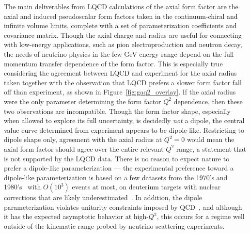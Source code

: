 

The main deliverables from LQCD calculations of the axial form factor
 are the axial and induced pseudoscalar form factors taken in the continuum-chiral
 and infinite volume limits, complete with a set of parameterization coefficients
 and covariance matrix.
Though the axial charge and radius are useful for connecting with low-energy applications,
 such as pion electroproduction and neutron decay,
 the needs of neutrino physics in the few-GeV energy range depend
 on the full momentum transfer dependence of the form factor.
 This is especially true considering the agreement between LQCD and experiment
 for the axial radius taken together with the observation that
 LQCD prefers a slower form factor fall off than experiment,
 as shown in Figure~\ref{fig:gaq2_overlay}.
If the axial radius were the only parameter determining the form factor $Q^2$ dependence,
 then these two observations are incompatible.
Though the form factor shape, especially when allowed to explore its full uncertainty,
 is decidedly \emph{not} a dipole, the central value curve determined
 from experiment appears to be dipole-like.
Restricting to dipole shape only, agreement with the axial radius at $Q^2=0$
 would mean the axial form factor should agree over the entire relevant $Q^2$ range,
 a statement that is not supported by the LQCD data.
There is no reason to expect nature to prefer a dipole-like parameterization ---
 the experimental preference toward a dipole-like parameterization is based on
 a few datasets from the 1970's and 1980's~\cite{ANL_Barish_1977, BNL_Baker_1981, Kitagaki:1983px}
 with $O(10^3)$ events at most,
 on deuterium targets with nuclear corrections that are likely underestimated~\cite{Meyer:2016oeg}.
In addition, the dipole parameterization violates
 unitarity constraints imposed by QCD~\cite{Bhattacharya:2011ah},
 and although it has the expected asymptotic behavior at high-$Q^2$,
 this occurs for a regime well outside of the kinematic range probed
 by neutrino scattering experiments.

